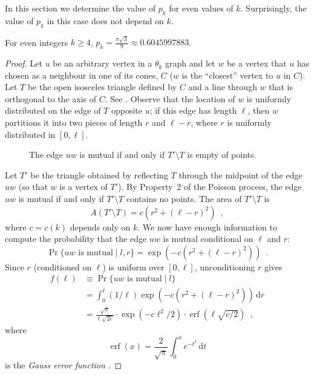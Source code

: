 \documentclass{patmorin}
\DeclareMathOperator{\erf}{erf}
\begin{document}
In this section we determine the value of $p_k$ for even values of $k$.
Surprisingly, the value of $p_k$ in this case does not depend on $k$.

\begin{lem}
 For even integers $k\ge 4$, $p_k=\frac{\pi\sqrt{3}}{9}\approx 0.6045997883$.
\end{lem}

\begin{proof}
  Let $u$ be an arbitrary vertex in a $\theta_k$ graph and let $w$
  be a vertex that $u$ has chosen as a neighbour in one of its cones,
  $C$ ($w$ is the ``closest'' vertex to $u$ in $C$).  Let $T$ be the
  open isosceles triangle defined by $C$ and a line
  through $w$ that is orthogonal to the axis of $C$. See .
  Observe that the location of $w$ is uniformly distributed on the
  edge of $T$ opposite $u$;  if this edge has length $\ell$, then $w$
  partitions it into two pieces of length $r$ and $\ell-r$, where $r$
  is uniformly distributed in $[0,\ell]$.

  \begin{figure}
    \caption{The edge $uw$ is mutual if and only if $T'\setminus T$ 
       is empty of points.}
  \end{figure}
 
  Let $T'$ be the triangle obtained by reflecting $T$ through the midpoint
  of the edge $uw$ (so that $w$ is a vertex of $T'$). By Property~2 of the
  Poisson process, the edge $uw$ is mutual if and only if $T'\setminus T$
  contains no points.  The area of $T'\setminus T$ is
  \[
     A(T'\setminus T) = c(r^2+(\ell-r)^2)  \enspace ,
  \]
  where $c=c(k)$ depends only on $k$.  We now have enough information
  to compute the probability that the edge $uw$ is mutual conditional
  on $\ell$ and $r$:
  \[
    \Pr\{\mbox{$uw$ is mutual} \mid l,r\} = \exp(-c(r^2+(\ell-r)^2))
      \enspace .
  \]
  Since $r$ (conditioned on $\ell$) is uniform over $[0,\ell]$, unconditioning
  $r$ gives
  \begin{align*}
    f(\ell) & \equiv \Pr\{\mbox{$uw$ is mutual} \mid l\} \\
     & = \int_0^\ell (1/\ell)\exp(-c(r^2+(\ell-r)^2))\,\mathrm{d}r \\
     & = \frac{\sqrt{\pi}}{\ell\sqrt{2c}}
            \cdot\exp(-c\ell^2/2)
            \cdot\erf(\ell\sqrt{c/2})  \enspace ,
  \end{align*}
  where 
  \[ \erf(x)=\frac{2}{\sqrt{\pi}}\int_0^x e^{-t^2}\,\mathrm{d}t \]
  is the \emph{Gauss error function} \cite{gauss-error}.  


\end{proof}
\end{document}
